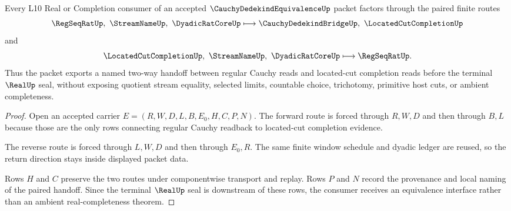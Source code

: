 \begin{theorem}
\label{thm:cauchy-dedekind-equivalence-two-way-handoff}
Every L10 Real or Completion consumer of an accepted $\CauchyDedekindEquivalenceUp$ packet factors through the paired finite routes
$$
\RegSeqRatUp,\ \StreamNameUp,\ \DyadicRatCoreUp
\longmapsto
\CauchyDedekindBridgeUp,\ \LocatedCutCompletionUp
$$
and
$$
\LocatedCutCompletionUp,\ \StreamNameUp,\ \DyadicRatCoreUp
\longmapsto
\RegSeqRatUp .
$$
Thus the packet exports a named two-way handoff between regular Cauchy reads and located-cut completion reads before the terminal $\RealUp$ seal, without exposing quotient stream equality, selected limits, countable choice, trichotomy, primitive host cuts, or ambient completeness.
\end{theorem}
\begin{proof}
Open an accepted carrier $E=(R,W,D,L,B,E_{0},H,C,P,N)$. The forward route is forced through $R,W,D$ and then through $B,L$ because those are the only rows connecting regular Cauchy readback to located-cut completion evidence.

The reverse route is forced through $L,W,D$ and then through $E_{0},R$. The same finite window schedule and dyadic ledger are reused, so the return direction stays inside displayed packet data.

Rows $H$ and $C$ preserve the two routes under componentwise transport and replay. Rows $P$ and $N$ record the provenance and local naming of the paired handoff. Since the terminal $\RealUp$ seal is downstream of these rows, the consumer receives an equivalence interface rather than an ambient real-completeness theorem.
\end{proof}





